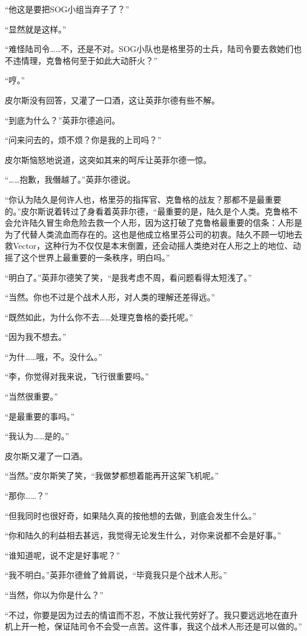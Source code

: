 “他这是要把SOG小组当弃子了？”

“显然就是这样。”

“难怪陆司令……不，还是不对。SOG小队也是格里芬的士兵，陆司令要去救她们也不违情理，克鲁格何至于如此大动肝火？”

“哼。”

皮尔斯没有回答，又灌了一口酒，这让英菲尔德有些不解。

“到底为什么？”英菲尔德追问。

“问来问去的，烦不烦？你是我的上司吗？”

皮尔斯恼怒地说道，这突如其来的呵斥让英菲尔德一惊。

“……抱歉，我僭越了。”英菲尔德说。

“你认为陆久是何许人也，格里芬的指挥官、克鲁格的战友？那都不是最重要的。”皮尔斯说着转过了身看着英菲尔德，“最重要的是，陆久是个人类。克鲁格不会允许陆久冒生命危险去救一个人形，因为这打破了克鲁格最重要的信条：人形是为了代替人类流血而存在的。这也是他成立格里芬公司的初衷。陆久不顾一切地去救Vector，这种行为不仅仅是本末倒置，还会动摇人类绝对在人形之上的地位、动摇了这个世界上最重要的一条秩序，明白吗。”

“明白了。”英菲尔德笑了笑，“是我考虑不周，看问题看得太短浅了。”

“当然。你也不过是个战术人形，对人类的理解还差得远。”

“既然如此，为什么你不去……处理克鲁格的委托呢。”

“因为我不想去。”

“为什……哦，不。没什么。”

“李，你觉得对我来说，飞行很重要吗。”

“当然很重要。”

“是最重要的事吗。”

“我认为……是的。”

皮尔斯又灌了一口酒。

“当然。”皮尔斯笑了笑，“我做梦都想着能再开这架飞机呢。”

“那你……？”

“但我同时也很好奇，如果陆久真的按他想的去做，到底会发生什么。”

“你和陆久的利益相去甚远，我觉得无论发生什么，对你来说都不会是好事。”

“谁知道呢，说不定是好事呢？”

“我不明白。”英菲尔德耸了耸肩说，“毕竟我只是个战术人形。”

“当然，你以为你是什么？”

“不过，你要是因为过去的情谊而不忍，不放让我代劳好了。我只要远远地在直升机上开一枪，保证陆司令不会受一点苦。这件事，我这个战术人形还是可以做的。”

